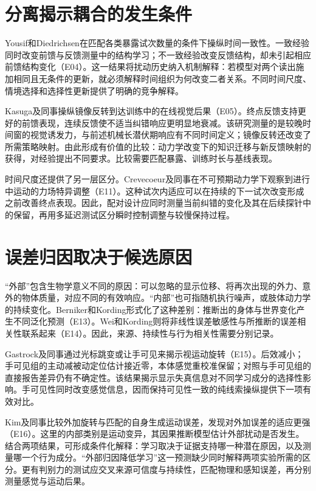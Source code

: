 \documentclass[11pt,a4paper]{article}
\begin{document}
\section{分离揭示耦合的发生条件}
Yousif和Diedrichsen在匹配各类暴露试次数量的条件下操纵时间一致性。一致经验同时改变前馈与反馈测量中的结构学习；不一致经验改变反馈结构，却未引起相应前馈结构变化（E04）。这一结果将扰动历史纳入机制解释：若模型对两个读出施加相同且无条件的更新，就必须解释时间组织为何改变二者关系。不同时间尺度、情境选择和选择性更新提供了明确的竞争解释。\cite{yousif2012}

Kasuga及同事操纵镜像反转到达训练中的在线视觉后果（E05）。终点反馈支持更好的前馈表现，连续反馈使不适当纠错响应更明显地衰减。该研究测量的是较晚时间窗的视觉诱发力，与前述机械长潜伏期响应有不同时间定义；镜像反转还改变了所需策略映射。由此形成有价值的比较：动力学改变下的知识迁移与新反馈映射的获得，对经验提出不同要求。比较需要匹配暴露、训练时长与基线表现。\cite{kasuga2015}

时间尺度还提供了另一层区分。Crevecoeur及同事在不可预期动力学下观察到进行中运动的力场特异调整（E11）。这种试次内适应可以在持续的下一试次改变形成之前改善终点表现。因此，配对设计应同时测量当前纠错的变化及其在后续探针中的保留，再用多延迟测试区分瞬时控制调整与较慢保持过程。\cite{crevecoeur2020}

\section{误差归因取决于候选原因}
“外部”包含生物学意义不同的原因：可以忽略的显示位移、将再次出现的外力、意外的物体质量，对应不同的有效响应。“内部”也可指随机执行噪声，或肢体动力学的持续变化。Berniker和Kording形式化了这种差别：推断出的身体与世界变化产生不同泛化预测（E13）。Wei和Kording则将非线性误差敏感性与所推断的误差相关性联系起来（E14）。因此，来源、持续性与行为相关性需要分别记录。\cite{berniker2008,wei2009}

Gastrock及同事通过光标跳变或让手可见来揭示视运动旋转（E15）。后效减小；手可见组的主动减被动定位估计接近零，本体感觉重校准保留；对照与手可见组的直接报告差异仍有不确定性。该结果揭示显示失真信息对不同学习成分的选择性影响。手可见性同时改变感觉信息，因而保持可见性一致的纯线索操纵提供下一项有效对比。\cite{external2020}

Kim及同事比较外加旋转与匹配的自身生成运动误差，发现对外加误差的适应更强（E16）。这里的内部类别是运动变异，其因果推断模型估计外部扰动是否发生。结合两项结果，可形成条件化解释：学习取决于证据支持哪一种潜在原因，以及测量哪一个行为成分。“外部归因降低学习”这一预测缺少同时解释两项实验所需的区分。更有判别力的测试应交叉来源可信度与持续性，匹配物理和感知误差，再分别测量感觉与运动后果。\cite{piece2025}
\end{document}
